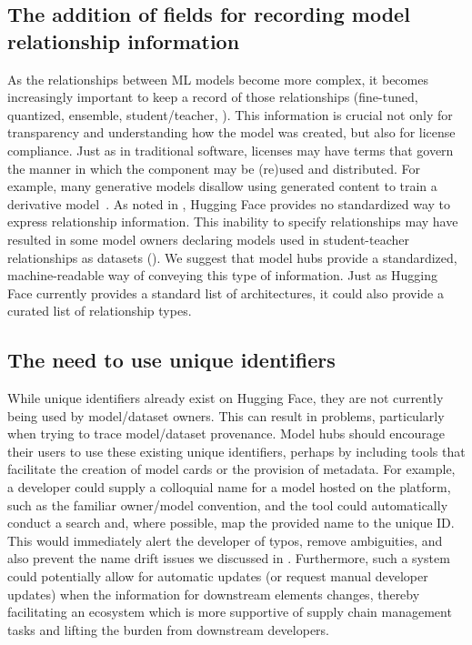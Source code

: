 \subsection{The addition of fields for recording model relationship information}


As the relationships between ML models become more complex, it becomes increasingly important to keep a record of those relationships (\eg fine-tuned, quantized, ensemble, student/teacher, \etc).  This information is crucial not only for transparency and understanding how the model was created, but also for license compliance.  Just as in traditional software, licenses may have terms that govern the manner in which the component may be (re)used and distributed. For example, many generative models disallow using generated content to train a derivative model~\cite{openai_terms}. As noted in , Hugging Face provides no standardized way to express relationship information.  This inability to specify relationships may have resulted in some model owners declaring models used in student-teacher relationships as datasets ().  We suggest that model hubs provide a standardized, machine-readable way of conveying this type of information.  Just as Hugging Face currently provides a standard list of architectures, it could also provide a curated list of relationship types.  

\subsection{The need to use unique identifiers}
While unique identifiers already exist on Hugging Face, they are not currently being used by model/dataset owners.  This can result in problems, particularly when trying to trace model/dataset provenance.  Model hubs should encourage their users to use these existing unique identifiers, perhaps by including tools that facilitate the creation of model cards or the provision of metadata.  For example, a developer could supply a colloquial name for a model hosted on the platform, such as the familiar owner/model convention, and the tool could automatically conduct a search and, where possible, map the provided name to the unique ID.  This would immediately alert the developer of typos, remove ambiguities, and also prevent the name drift issues we discussed in . Furthermore, such a system could potentially allow for automatic updates (or request manual developer updates) when the information for downstream elements changes, thereby facilitating an ecosystem which is more supportive of supply chain management tasks and lifting the burden from downstream developers.


